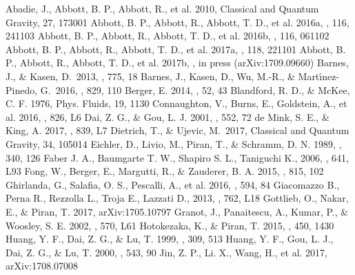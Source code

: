 \documentclass{emulateapj}
\begin{document}
{\begin{thebibliography}{}

Abadie, J., Abbott, B. P., Abbott, R., et al. 2010, Classical and Quantum Gravity, 27, 173001
Abbott, B. P., Abbott, R., Abbott, T. D., et al. 2016a, \prl, 116, 241103
Abbott, B. P., Abbott, R., Abbott, T. D., et al. 2016b, \prl, 116, 061102
Abbott, B. P., Abbott, R., Abbott, T. D., et al. 2017a, \prl, 118, 221101
Abbott, B. P., Abbott, R., Abbott, T. D., et al. 2017b, \prl, in press (arXiv:1709.09660)
 Barnes, J., \& Kasen, D.\ 2013, \apj, 775, 18
 Barnes, J., Kasen, D., Wu, M.-R., \& Mart{\'{\i}}nez-Pinedo, G.\ 2016, \apj, 829, 110
Berger, E. 2014, \araa, 52, 43
Blandford, R. D., \& McKee, C. F. 1976, Phys. Fluids, 19, 1130
Connaughton, V., Burns, E., Goldstein, A., et al. 2016, \apj, 826, L6
Dai, Z. G., \& Gou, L. J. 2001, \apj, 552, 72
de Mink, S. E., \& King, A. 2017, \apj, 839, L7
 Dietrich, T., \& Ujevic, M.\ 2017, Classical and Quantum Gravity, 34, 105014
Eichler, D., Livio, M., Piran, T., \& Schramm, D. N. 1989, \nat, 340, 126
Faber J. A., Baumgarte T. W., Shapiro S. L., Taniguchi K., 2006, \apjl, 641, L93
Fong, W., Berger, E., Margutti, R., \& Zauderer, B. A. 2015, \apj, 815, 102
Ghirlanda, G., Salafia, O. S., Pescalli, A., et al. 2016, \aap, 594, 84
Giacomazzo B., Perna R., Rezzolla L., Troja E., Lazzati D., 2013, \apjl, 762, L18
Gottlieb, O., Nakar, E., \& Piran, T. 2017, arXiv:1705.10797
Granot, J., Panaitescu, A., Kumar, P., \& Woosley, S. E. 2002, \apj, 570, L61
Hotokezaka, K., \& Piran, T. 2015, \mnras, 450, 1430
Huang, Y. F., Dai, Z. G., \& Lu, T. 1999, \mnras, 309, 513
Huang, Y. F., Gou, L. J., Dai, Z. G., \& Lu, T. 2000, \apj, 543, 90
Jin, Z. P., Li. X., Wang, H., et al. 2017, arXiv:1708.07008

\end{thebibliography}}
\end{document}
